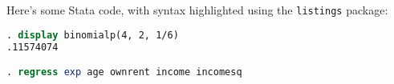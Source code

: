 



\noindent Here's some Stata code, with syntax highlighted using the \texttt{listings} package:\\

\begin{lstlisting}[language=Stata, numbers=none]
. display binomialp(4, 2, 1/6)
.11574074

. regress exp age ownrent income incomesq
\end{lstlisting}





